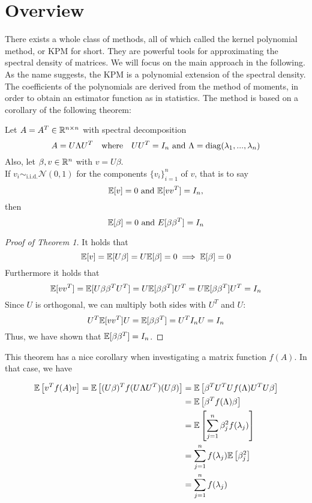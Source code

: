 \section{Overview}
There exists a whole class of methods, all of which called the kernel polynomial method, or KPM for short.
They are powerful tools for approximating the spectral density of matrices.
We will focus on the main approach in the following.\\
As the name suggests, the KPM is a polynomial extension of the spectral density.
The coefficients of the polynomials are derived from the method of moments,
in order to obtain an estimator function as in statistics.
The method is based on a corollary of the following theorem:


\begin{theorem}
    Let $A = A^T \in \mathbb{R}^{n \times n}$ with spectral decomposition
    \[
    A = U \Lambda U^T \quad \text{where} \quad UU^T = I_n \text{ and } \Lambda = \operatorname{diag}(\lambda_1, ..., \lambda_n)
    \] 
    Also, let $\beta, v \in \mathbb{R}^n$ with $v = U\beta$.\\
    If $v_i \sim_\text{i.i.d.} \mathcal{N}(0, 1)$ for the components $\{v_i\}_{i = 1}^n$ of $v$, that is to say
    \begin{equation} \label{eq:normal_distributed_vector}
        \mathbb{E}[v] = 0 \text{ and } \mathbb{E}[vv^T] = I_n \text{,}
    \end{equation}
    then
    \[
    \mathbb{E}[\beta] = 0 \text{ and } E[\beta \beta^T] = I_n
    \]
\end{theorem}


\begin{proof}[Proof of Theorem 1]
    It holds that
    \[
    \mathbb{E}[v] = \mathbb{E}[U\beta] = U\mathbb{E}[\beta] = 0 \implies \mathbb{E}[\beta] = 0
    \]
    Furthermore it holds that
    \[
    \mathbb{E}[vv^T] = \mathbb{E}[U\beta \beta^TU^T] = U \mathbb{E}[\beta \beta^T]U^T = U \mathbb{E}[\beta \beta^T]U^T = I_n
    \]
    Since $U$ is orthogonal, we can multiply both sides with $U^T$ and $U$:
    \[
    U^T \mathbb{E}[vv^T] U = \mathbb{E}[\beta \beta^T] = U^T I_n U = I_n
    \]
    Thus, we have shown that $\mathbb{E}[\beta \beta^T] = I_n$.
\end{proof}

\vspace{0.5 cm}
This theorem has a nice corollary when investigating a matrix function $f(A)$.
In that case, we have

\begin{align*}
    \mathbb{E}\left[v^Tf(A)v\right] = \mathbb{E}\left[(U\beta)^Tf(U\Lambda U^T)(U\beta)\right] & = \mathbb{E}\left[\beta^TU^TUf(\Lambda)U^TU\beta\right]\\
        & = \mathbb{E}\left[\beta^Tf(\Lambda)\beta\right]\\
        & = \mathbb{E}\left[\sum_{j = 1}^n \beta_j^2 f(\lambda_j) \right]\\
        & = \sum_{j = 1}^n f(\lambda_j) \mathbb{E}\left[ \beta_j^2 \right]\\
        & = \sum_{j = 1}^n f(\lambda_j)
\end{align*}

